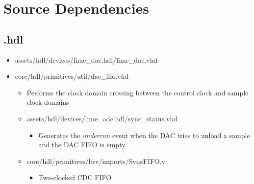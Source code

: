 \section*{Source Dependencies}
\subsection*{\comp.hdl}
\begin{itemize}
	\item assets/hdl/devices/lime\_dac.hdl/lime\_dac.vhd
	\item core/hdl/primitives/util/dac\_fifo.vhd
      \begin{itemize}
      	\item Performs the clock domain crossing between the control clock and sample clock domains
		\item assets/hdl/devices/lime\_adc.hdl/sync\_status.vhd
    		\begin{itemize}
			\item Generates the \textit{underrun} event when the DAC tries to unload a sample and the DAC FIFO is empty
		\end{itemize}
		\item core/hdl/primitives/bsv/imports/SyncFIFO.v
    		\begin{itemize}
		    	\item Two-clocked CDC FIFO
	    \end{itemize}
      \end{itemize}
\end{itemize}
